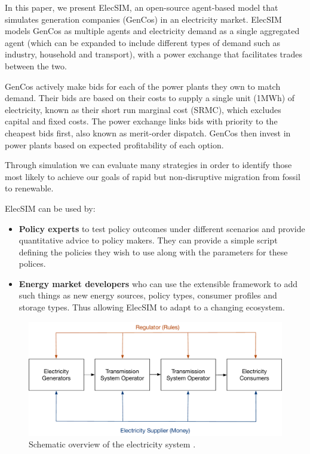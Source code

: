 In this paper, we present ElecSIM, an open-source agent-based model that simulates generation companies (GenCos) in an electricity market. ElecSIM models GenCos as multiple agents and electricity demand as a single aggregated agent (which can be expanded to include different types of demand such as industry, household and transport), with a power exchange that facilitates trades between the two. 

GenCos actively make bids for each of the power plants they own to match demand. Their bids are based on their costs to supply a single unit (1MWh) of electricity, known as their short run marginal cost (SRMC), which excludes capital and fixed costs. The power exchange links bids with priority to the cheapest bids first, also known as merit-order dispatch. GenCos then invest in power plants based on expected profitability of each option.


Through simulation we can evaluate many strategies in order to identify those most likely to achieve our goals of rapid but non-disruptive migration from fossil to renewable.






ElecSIM can be used by:
\begin{itemize}
	\item {\bf Policy experts} to test policy outcomes under different scenarios and provide quantitative advice to policy makers. They can provide a simple script defining the policies they wish to use along with the parameters for these polices.
	\item {\bf Energy market developers} who can use the extensible framework to add such things as new energy sources, policy types, consumer profiles and storage types. Thus allowing ElecSIM to adapt to a changing ecosystem.
\end{itemize}


\begin{figure}
	\centering
	\includegraphics[width=0.9\linewidth]{figures/main_electricty_players}
	\caption{Schematic overview of the electricity system \cite{Erbach2016}.}
	\label{fig:mainelectrictyplayers}
\end{figure}




